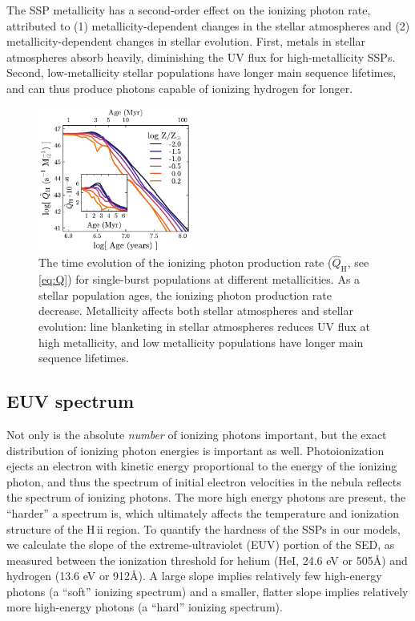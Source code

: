 \documentclass[linenumbers, trackchanges, tighten]{aastex61}%
\newcommand{\Eq}[1]{\autoref{eq:#1}}
\newcommand{\hii}{H\,{\sc ii}\xspace}
\newcommand{\ang}{\ensuremath{\mbox{\AA}}}
\newcommand{\QHat}{\ensuremath{\hat{Q}_{\mathrm{H}}}}
\begin{document}
The SSP metallicity has a second-order effect on the ionizing photon rate, attributed to (1) metallicity-dependent changes in the stellar atmospheres and (2) metallicity-dependent changes in stellar evolution. First, metals in stellar atmospheres absorb heavily, diminishing the UV flux for high-metallicity SSPs. Second, low-metallicity stellar populations have longer main sequence lifetimes, and can thus produce photons capable of ionizing hydrogen for longer.

\begin{figure}[!htbp]
  \begin{centering}
    \includegraphics[width=0.45\textwidth]{f2.pdf}
    \caption{The time evolution of the ionizing photon production rate (\QHat{}, see \Eq{Q}) for single-burst populations at different metallicities. As a stellar population ages, the ionizing photon production rate decrease. Metallicity affects both stellar atmospheres and stellar evolution: line blanketing in stellar atmospheres reduces UV flux at high metallicity, and low metallicity populations have longer main sequence lifetimes.}
    \label{fig:QH}
  \end{centering}
\end{figure}

\subsection{EUV spectrum}\label{sec:spectra:EUV}

Not only is the absolute \emph{number} of ionizing photons important, but the exact distribution of ionizing photon energies is important as well. Photoionization ejects an electron with kinetic energy proportional to the energy of the ionizing photon, and thus the spectrum of initial electron velocities in the nebula reflects the spectrum of ionizing photons. The more high energy photons are present, the ``harder'' a spectrum is, which ultimately affects the temperature and ionization structure of the \hii region. To quantify the hardness of the SSPs in our models, we calculate the slope of the extreme-ultraviolet (EUV) portion of the SED, as measured between the ionization threshold for helium (HeI, 24.6 eV or 505\ang{}) and hydrogen (13.6 eV or 912\ang{}). A large slope implies relatively few high-energy photons (a ``soft'' ionizing spectrum) and a smaller, flatter slope implies relatively more high-energy photons (a ``hard'' ionizing spectrum). 
\end{document}
